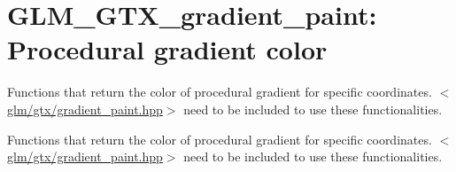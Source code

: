 \hypertarget{group__gtx__gradient__paint}{\section{\-G\-L\-M\-\_\-\-G\-T\-X\-\_\-gradient\-\_\-paint\-: \-Procedural gradient color}
\label{group__gtx__gradient__paint}
}


\-Functions that return the color of procedural gradient for specific coordinates. $<$\hyperlink{gradient__paint_8hpp}{glm/gtx/gradient\-\_\-paint.\-hpp}$>$ need to be included to use these functionalities.  


\-Functions that return the color of procedural gradient for specific coordinates. $<$\hyperlink{gradient__paint_8hpp}{glm/gtx/gradient\-\_\-paint.\-hpp}$>$ need to be included to use these functionalities. 